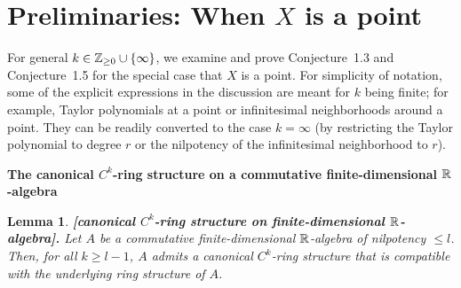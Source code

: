 \documentclass[11pt]{article}
\numberwithin{equation}{subsection}
\newtheorem{slemma}[stheorem]{Lemma}
\begin{document}
\bigskip

\section{Preliminaries: When $X$ is a point}	

For general $k\in {\Bbb Z}_{\ge 0}\cup\{\infty\}$,
 we examine and prove Conjecture~1.3 and Conjecture~1.5 for the special case that $X$ is a point.
For simplicity of notation,
 some of the explicit expressions in the discussion are meant for $k$ being finite;
 for example, Taylor polynomials at a point or infinitesimal neighborhoods around a point.
They can be readily converted to the case $k={\infty}$
 (by restricting the Taylor polynomial to degree $r$
     or the nilpotency of the infinitesimal neighborhood to $r$).



\bigskip

\begin{flushleft}
{\bf The canonical $C^k$-ring structure on a commutative finite-dimensional ${\Bbb R}$-algebra}
\end{flushleft}

\begin{slemma}
{\bf [canonical $C^k$-ring structure on finite-dimensional ${\Bbb R}$-algebra].}	
 Let $A$ be a commutative finite-dimensional ${\Bbb R}$-algebra of nilpotency $\le l$.
 Then, for all $k\ge l-1$,
   $A$ admits a canonical $C^k$-ring structure
   that is compatible with the underlying ring structure of $A$.
\end{slemma}
\end{document}
